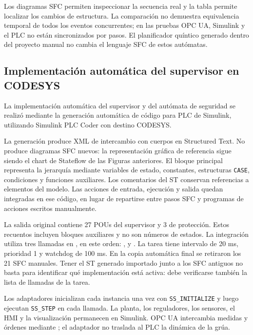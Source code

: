\documentclass[a4paper,10pt,onecolumn,journal]{ieeeconf}
\numberwithin{equation}{section}
\begin{document}
Los diagramas SFC permiten inspeccionar la secuencia real y la tabla permite localizar los cambios de estructura. La comparación no demuestra equivalencia temporal de todos los eventos concurrentes; en las pruebas OPC UA, Simulink y el PLC no están sincronizados por pasos. El planificador quíntico generado dentro del proyecto manual no cambia el lenguaje SFC de estos autómatas.



\subsection{Implementación automática del supervisor en CODESYS}
La implementación automática del supervisor y del autómata de seguridad se realizó mediante la generación automática de código para PLC de Simulink, utilizando Simulink PLC Coder con destino CODESYS.

La generación produce XML de intercambio con cuerpos en Structured Text. No produce diagramas SFC nuevos: la representación gráfica de referencia sigue siendo el chart de Stateflow de las Figuras anteriores. El bloque principal  representa la jerarquía mediante variables de estado, constantes, estructuras \texttt{CASE}, condiciones y funciones auxiliares. Los comentarios del ST conservan referencias a elementos del modelo. Las acciones de entrada, ejecución y salida quedan integradas en ese código, en lugar de repartirse entre pasos SFC y programas de acciones escritos manualmente.

La salida original contiene 27 POUs del supervisor y 3 de protección. Estos recuentos incluyen bloques auxiliares y no son números de estados. La integración utiliza tres llamadas en , en este orden: ,  y . La tarea tiene intervalo de 20 ms, prioridad 1 y watchdog de 100 ms. En la copia automática final se retiraron los 21 SFC manuales. Tener el ST generado importado junto a los SFC antiguos no basta para identificar qué implementación está activa: debe verificarse también la lista de llamadas de la tarea.

Los adaptadores inicializan cada instancia una vez con \texttt{SS\_INITIALIZE} y luego ejecutan \texttt{SS\_STEP} en cada llamada. La planta, los reguladores, los sensores, el HMI y la visualización permanecen en Simulink. OPC UA intercambia medidas y órdenes mediante ; el adaptador no traslada al PLC la dinámica de la grúa.
\end{document}
